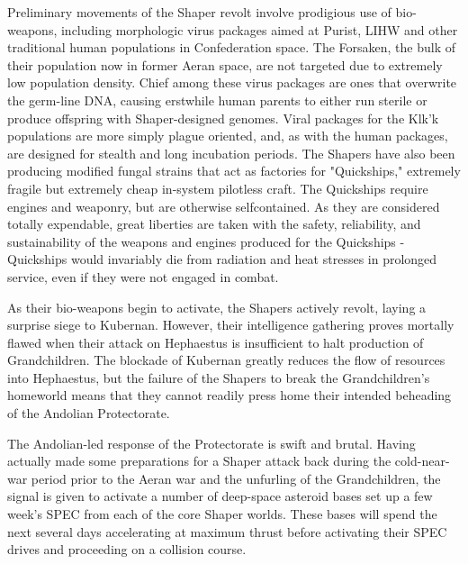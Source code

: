 Preliminary movements of the Shaper revolt involve prodigious use of
bio-weapons, including morphologic virus packages aimed at Purist,
LIHW and other traditional human populations in Confederation
space. The Forsaken, the bulk of their population now in former Aeran
space, are not targeted due to extremely low population density. Chief
among these virus packages are ones that overwrite the germ-line DNA,
causing erstwhile human parents to either run sterile or produce
offspring with Shaper-designed genomes. Viral packages for the Klk'k
populations are more simply plague oriented, and, as with the human
packages, are designed for stealth and long incubation periods. The
Shapers have also been producing modified fungal strains that act as
factories for "Quickships," extremely fragile but extremely cheap
in-system pilotless craft. The Quickships require engines and
weaponry, but are otherwise selfcontained. As they are considered
totally expendable, great liberties are taken with the safety,
reliability, and sustainability of the weapons and engines produced
for the Quickships - Quickships would invariably die from radiation
and heat stresses in prolonged service, even if they were not engaged
in combat.

As their bio-weapons begin to activate, the Shapers actively revolt,
laying a surprise siege to Kubernan. However, their intelligence
gathering proves mortally flawed when their attack on Hephaestus is
insufficient to halt production of Grandchildren. The blockade of
Kubernan greatly reduces the flow of resources into Hephaestus, but
the failure of the Shapers to break the Grandchildren's homeworld
means that they cannot readily press home their intended beheading of
the Andolian Protectorate.

The Andolian-led response of the Protectorate is swift and
brutal. Having actually made some preparations for a Shaper attack
back during the cold-near-war period prior to the Aeran war and the
unfurling of the Grandchildren, the signal is given to activate a
number of deep-space asteroid bases set up a few week's SPEC from each
of the core Shaper worlds. These bases will spend the next several
days accelerating at maximum thrust before activating their SPEC
drives and proceeding on a collision course.

